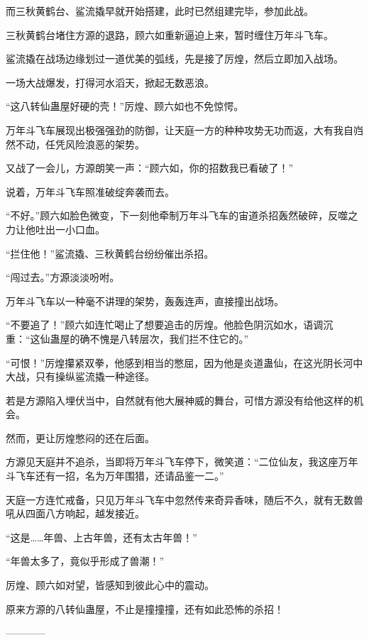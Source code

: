\begin{this_body}
而三秋黄鹤台、鲨流撬早就开始搭建，此时已然组建完毕，参加此战。

三秋黄鹤台堵住方源的退路，顾六如重新逼迫上来，暂时缠住万年斗飞车。

鲨流撬在战场边缘划过一道优美的弧线，先是接了厉煌，然后立即加入战场。

一场大战爆发，打得河水滔天，掀起无数恶浪。

“这八转仙蛊屋好硬的壳！”厉煌、顾六如也不免惊愕。

万年斗飞车展现出极强强劲的防御，让天庭一方的种种攻势无功而返，大有我自岿然不动，任凭风险浪恶的架势。

又战了一会儿，方源朗笑一声：“顾六如，你的招数我已看破了！”

说着，万年斗飞车照准破绽奔袭而去。

“不好。”顾六如脸色微变，下一刻他牵制万年斗飞车的宙道杀招轰然破碎，反噬之力让他吐出一小口血。

“拦住他！”鲨流撬、三秋黄鹤台纷纷催出杀招。

“闯过去。”方源淡淡吩咐。

万年斗飞车以一种毫不讲理的架势，轰轰连声，直接撞出战场。

“不要追了！”顾六如连忙喝止了想要追击的厉煌。他脸色阴沉如水，语调沉重：“这仙蛊屋的确不愧是八转层次，我们拦不住它的。”

“可恨！”厉煌攥紧双拳，他感到相当的憋屈，因为他是炎道蛊仙，在这光阴长河中大战，只有操纵鲨流撬一种途径。

若是方源陷入埋伏当中，自然就有他大展神威的舞台，可惜方源没有给他这样的机会。

然而，更让厉煌憋闷的还在后面。

方源见天庭并不追杀，当即将万年斗飞车停下，微笑道：“二位仙友，我这座万年斗飞车还有一招，名为万年围猎，还请品鉴一二。”

天庭一方连忙戒备，只见万年斗飞车中忽然传来奇异香味，随后不久，就有无数兽吼从四面八方响起，越发接近。

“这是……年兽、上古年兽，还有太古年兽！”

“年兽太多了，竟似乎形成了兽潮！”

厉煌、顾六如对望，皆感知到彼此心中的震动。

原来方源的八转仙蛊屋，不止是撞撞撞，还有如此恐怖的杀招！

------------

\end{this_body}

